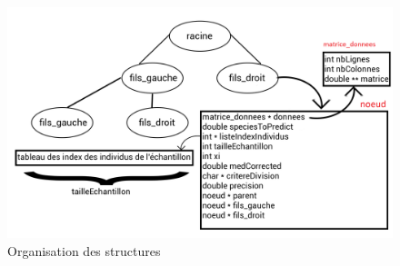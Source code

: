 \begin{figure}[H]
	\begin{center}
		\includegraphics[scale=0.27]{./img/schema.png}
	\end{center}
	\caption{Organisation des structures}
\end{figure}